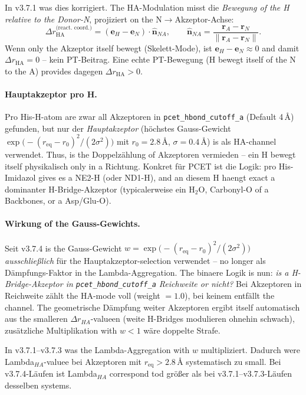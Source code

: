 \documentclass[11pt,a4paper,twoside]{article}
\theoremstyle{remark}
\begin{document}
In v3.7.1 was dies korrigiert. The HA-Modulation misst die
\emph{Bewegung of the H relative to the Donor-N}, projiziert on the
N$\to$Akzeptor-Achse:
\begin{equation}
  \Delta r_\text{HA}^\text{(react.\ coord.)}
  = (\mathbf{e}_H - \mathbf{e}_N) \cdot \hat{\mathbf{n}}_{NA},
  \qquad
  \hat{\mathbf{n}}_{NA} = \frac{\mathbf{r}_A - \mathbf{r}_N}{\|\mathbf{r}_A - \mathbf{r}_N\|}.
  \label{eq:dr-reaction-coord}
\end{equation}
Wenn only the Akzeptor itself bewegt (Skelett-Mode), ist
$\mathbf{e}_H - \mathbf{e}_N \approx 0$ and damit
$\Delta r_\text{HA} = 0$ -- kein PT-Beitrag. Eine echte PT-Bewegung
(H bewegt itself of the N to the A) provides dagegen $\Delta r_\text{HA} > 0$.

\paragraph{Hauptakzeptor pro H.}
Pro His-H-atom are zwar all Akzeptoren in
\texttt{pcet\_hbond\_cutoff\_a} (Default 4\,\AA) gefunden, but nur
der \emph{Hauptakzeptor} (h\"ochstes Gauss-Gewicht
$\exp\bigl(-(r_{\text{eq}} - r_0)^2/(2\sigma^2)\bigr)$ mit
$r_0 = 2.8$\,\AA, $\sigma = 0.4$\,\AA) is als HA-channel verwendet.
Thus, is the Doppelz\"ahlung of Akzeptoren vermieden -- ein
H bewegt itself physikalisch only in a Richtung. Konkret f\"ur PCET ist
die Logik: pro His-Imidazol gives es a NE2-H (oder ND1-H), and an
diesem H haengt exact a dominanter H-Bridge-Akzeptor (typicalerweise
ein H$_2$O, Carbonyl-O of a Backbones, or a Asp/Glu-O).

\paragraph{Wirkung of the Gauss-Gewichts.}
Seit v3.7.4 is the Gauss-Gewicht
$w = \exp\bigl(-(r_{\text{eq}} - r_0)^2/(2\sigma^2)\bigr)$
\emph{ausschlie{\ss}lich} f\"ur the Hauptakzeptor-selection verwendet --
no longer als D\"ampfungs-Faktor in the Lambda-Aggregation. The binaere
Logik is nun: \emph{is a H-Bridge-Akzeptor in
\texttt{pcet\_hbond\_cutoff\_a} Reichweite or nicht?} Bei Akzeptoren
in Reichweite z\"ahlt the HA-mode voll (weight $= 1.0$), bei keinem
entf\"allt the channel. The geometrische D\"ampfung weiter Akzeptoren
ergibt itself automatisch aus the smalleren $\Delta r_{HA}$-valueen
(weite H-Bridges modulieren ohnehin schwach), zus\"atzliche
Multiplikation with $w < 1$ w\"are doppelte Strafe.

In v3.7.1--v3.7.3 was the Lambda-Aggregation with $w$ multipliziert.
Dadurch were Lambda$_{HA}$-valuee bei Akzeptoren mit
$r_{\text{eq}} > 2.8$\,\AA{} systematisch zu small. Bei v3.7.4-L\"aufen
ist Lambda$_{HA}$ correspond tod gr\"o{\ss}er als bei v3.7.1--v3.7.3-L\"aufen
desselben systems.
\end{document}
